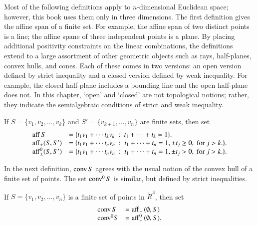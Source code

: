Most of the following definitions apply to $n$-dimensional
Euclidean space; however, this book uses them only in
three dimensions.  The first definition 
gives the affine span of a finite set.  For example,
the affine span of two distinct points is a line;
the affine spane of three independent points is a plane.
By placing additional
positivity constraints on the linear combinations, the definitions
extend to a large assortment of other geometric objects
such as rays, half-planes, convex hulls, and cones.  
Each of these comes in two versions: an open version
defined by strict inequality and a closed version defined
by weak inequality.  For example, the closed half-plane
includes a bounding line and the open half-plane does
not.  In this chapter, `open' and `closed' are not topological notions; rather, they
indicate the semialgebraic conditions of strict  and weak inequality.


\begin{definition}[affine]\label{def:aff} 
 If $S = \{v_1,v_2,\ldots,v_k\}$ 
and $S'=\{v_{k+1},\ldots,v_n\}$ are  finite sets, then
set
	$$\begin{array}{lll}
      {\operatorname{aff}}\, S &= \{t_1 v_1 +\cdots t_k v_k \ :\ 
	t_1 +\cdots+t_k = 1\}.\\
        {\operatorname{aff}}_{\pm} (S,S') &= \{t_1 v_1 +\cdots t_n v_n \ :\ 
	t_1 +\cdots+t_n = 1, \pm t_j \ge 0, \text{ for } j>k.\}.\\
        {\operatorname{aff}}^0_{\pm} (S,S') &= \{t_1 v_1 +\cdots t_n v_n \ :\ 
	t_1 +\cdots+t_n = 1, \pm t_j > 0, \text{ for } j>k.\}.\\
		\end{array}
        $$
\end{definition}


In the next definition, ${\operatorname{conv}}\,S$ agrees with the usual
notion of the convex hull of a finite set of points.
The set ${\operatorname{conv}}^0\,S$ is similar, but defined by strict inequalities.


\begin{definition}  If $S = \{v_1,v_2,\ldots,v_n\}$ is a finite set
of points in $\ring{R}^3$, then
set
	$$
        \begin{array}{lll}
          {\operatorname{conv}}\, S &= {\operatorname{aff}}_+\, (\emptyset,S)\\
	   {\operatorname{conv}}^0 S &= {\operatorname{aff}}^0_+\, (\emptyset,S).\\
           \end{array}
        $$
\end{definition}

